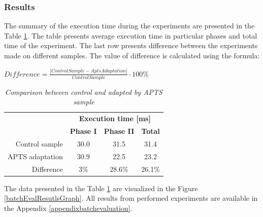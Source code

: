 \documentclass[12pt,a4paper]{article}
\begin{document}
\subsubsection{Results} \label{section:batchresults}

The summary of the execution time during the experiments are presented in the Table \ref{batchCompResutls}. The table presents average execution time in particular phases and total time of the experiment. The last row presents difference between the experiments made on different samples. The value of difference is calculated using the formula: 

\begin{center}
$Difference = \frac{|ControlSample - AptsAdaptation|}{ControlSample}\cdot 100\%$
\end{center}


\begin{table}[!htb]
\caption{\textit{Comparison between control and adapted by APTS sample}} \label{batchCompResutls}
\begin{center}
\begin{tabular}{r|ccc}
                 &  \multicolumn{3}{c}{\textbf{Execution time [ms]}} \\
                 &  \textbf{Phase I } & \textbf{Phase II} & \textbf{Total} \\ \hline
Control sample   &  30.0 & 31.5 & 31.4 \\ 
APTS adaptation  &  30.9 & 22.5 & 23.2 \\ \hline
Difference       &  3\% & 28.6\% & 26.1\% \\ 
\end{tabular}
\end{center}
\end{table}

The data presented in the Table \ref{batchCompResutls} are visualized in the Figure \ref{batchEvalResutlsGraph}.  All results from performed experiments are available in the Appendix \ref{appendixbatchevaluation}. 
\end{document}
